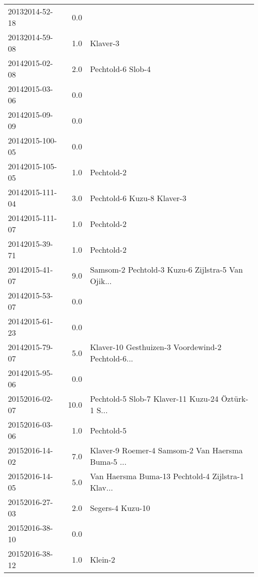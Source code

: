 \begin{tabular}{lrl}
20132014-52-18  &       0.0 &                                                    \\
20132014-59-08  &       1.0 &                                           Klaver-3 \\
20142015-02-08  &       2.0 &                                  Pechtold-6 Slob-4 \\
20142015-03-06  &       0.0 &                                                    \\
20142015-09-09  &       0.0 &                                                    \\
20142015-100-05 &       0.0 &                                                    \\
20142015-105-05 &       1.0 &                                         Pechtold-2 \\
20142015-111-04 &       3.0 &                         Pechtold-6 Kuzu-8 Klaver-3 \\
20142015-111-07 &       1.0 &                                         Pechtold-2 \\
20142015-39-71  &       1.0 &                                         Pechtold-2 \\
20142015-41-07  &       9.0 &  Samsom-2 Pechtold-3 Kuzu-6 Zijlstra-5 Van Ojik... \\
20142015-53-07  &       0.0 &                                                    \\
20142015-61-23  &       0.0 &                                                    \\
20142015-79-07  &       5.0 &  Klaver-10 Gesthuizen-3 Voordewind-2 Pechtold-6... \\
20142015-95-06  &       0.0 &                                                    \\
20152016-02-07  &      10.0 &  Pechtold-5 Slob-7 Klaver-11 Kuzu-24 Öztürk-1 S... \\
20152016-03-06  &       1.0 &                                         Pechtold-5 \\
20152016-14-02  &       7.0 &  Klaver-9 Roemer-4 Samsom-2 Van Haersma Buma-5 ... \\
20152016-14-05  &       5.0 &  Van Haersma Buma-13 Pechtold-4 Zijlstra-1 Klav... \\
20152016-27-03  &       2.0 &                                   Segers-4 Kuzu-10 \\
20152016-38-10  &       0.0 &                                                    \\
20152016-38-12  &       1.0 &                                            Klein-2 \\
\bottomrule
\end{tabular}
